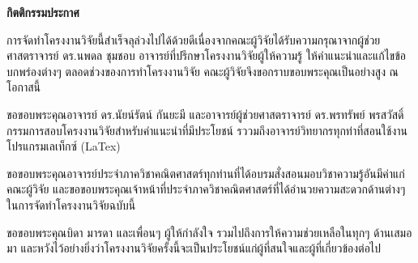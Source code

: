 \thispagestyle{empty}
\vspace{2 cm}
{\huge \bf กิตติกรรมประกาศ}
\vspace{2 cm}

\hspace{1cm}การจัดทำโครงงานวิจัยนี้สำเร็จลุล่วงไปได้ด้วยดีเนื่องจากคณะผู้วิจัยได้รับความกรุณาจากผู้ช่วยศาสตราจารย์ ดร.นพดล ชุมชอบ อาจารย์ที่ปรึกษาโครงงานวิจัยผู้ให้ความรู้ ให้คำแนะนำและแก้ไขข้อบกพร่องต่างๆ ตลอดช่วงของการทำโครงงานวิจัย คณะผู้วิจัยจึงขอกราบขอบพระคุณเป็นอย่างสูง ณ โอกาสนี้

\hspace{1cm}ขอขอบพระคุณอาจารย์ ดร.นัยน์รัตน์ กันยะมี และอาจารย์ผู้ช่วยศาสตราจารย์ ดร.พรทรัพย์ พรสวัสดิ์ กรรมการสอบโครงงานวิจัยสำหรับคำแนะนำที่มีประโยชน์ รววมถึงอาจารย์วิทยากรทุกท่าที่สอนใช้งานโปรแกรมเลเท็กซ์ (LaTex)

\hspace{1cm}ขอขอบพระคุณอาจารย์ประจำภาควิชาคณิตศาสตร์ทุกท่านที่ได้อบรมสั่งสอนมอบวิชาความรู้อันมีค่าแก่คณะผู้วิจัย และขอขอบพระคุณเจ้าหน้าที่ประจำภาควิชาคณิตศาสตร์ที่ได้อำนวยความสะดวกด้านต่างๆ ในการจัดทำโครงงานวิจัยฉบับนี้

\hspace{1cm}ขอขอบพระคุณบิดา มารดา และเพื่อนๆ ผู้ให้กำลังใจ รวมไปถึงการให้ความช่วยเหลือในทุกๆ ด้านเสมอมา และหวังไว้อย่างยิ่งว่าโครงงานวิจัยครั้งนี้จะเป็นประโยชน์แก่ผู้ที่สนใจและผู้ที่เกี่ยวข้องต่อไป



\newpage